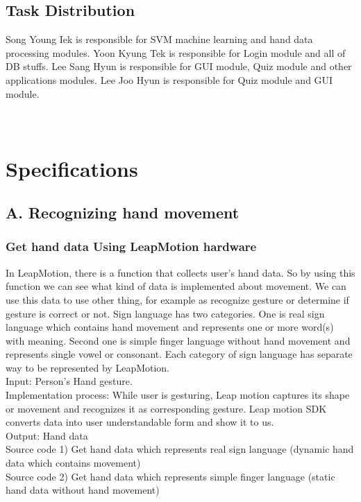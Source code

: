 \documentclass[10pt,journal,compsoc]{IEEEtran}
\begin{document}
\subsection{Task Distribution}
Song Young Iek is responsible for SVM machine learning and hand data processing modules.
Yoon Kyung Tek is responsible for Login module and all of DB stuffs.
Lee Sang Hyun is responsible for GUI module, Quiz module and other applications modules.
Lee Joo Hyun is responsible for Quiz module and GUI module.\\\\\\

\ifCLASSOPTIONcompsoc
{}
\else
\section{Specifications}
\label{sec:Specifications}
\fi
\subsection{A. Recognizing hand movement}


\subsubsection{Get hand data Using LeapMotion hardware\\}
In LeapMotion, there is a function that collects user’s hand data. So by using this function we can see what kind of data is implemented about movement. We can use this data to use other thing, for example as recognize gesture or determine if gesture is correct or not.
Sign language has two categories. One is real sign language which contains hand movement and represents one or more word(s) with meaning. Second one is simple finger language without hand movement and represents single vowel or consonant. Each category of sign language has separate way to be represented by LeapMotion.
\\Input: Person's Hand gesture.
\\Implementation process: While user is gesturing, Leap motion captures its shape or movement and recognizes it as corresponding gesture. Leap motion SDK converts data into user understandable form and show it to us.
\\Output: Hand data
\\Source code 1) Get hand data which represents real sign language (dynamic hand data which contains movement)\\
Source code 2) Get hand data which represents simple finger language (static hand data without hand movement)\\
\end{document}
